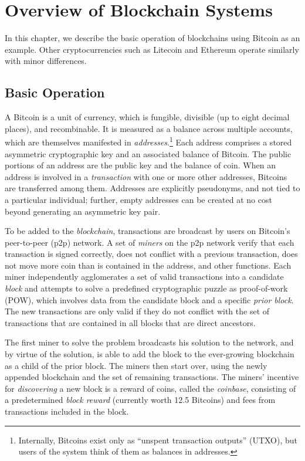 \chapter{Overview of Blockchain Systems}

In this chapter, we describe the basic operation of blockchains using Bitcoin as an example. Other cryptocurrencies such as Litecoin and Ethereum operate similarly with minor differences.

\section{Basic Operation}

 A Bitcoin is a unit of currency, which is
fungible, divisible (up to eight decimal places), and recombinable.
It is measured as a balance across multiple accounts, which are
themselves manifested in \emph{addresses}.$\!$\footnote{Internally,
  Bitcoins exist only as ``unspent transaction outputs'' (UTXO), but
  users of the system think of them as balances in addresses. } Each address
comprises a stored asymmetric cryptographic key and an associated
balance of Bitcoin. The public portions of an address are the public
key and the balance of coin. When an address is involved in a
\emph{transaction} with one or more other addresses, Bitcoins are
transferred among them. Addresses are explicitly pseudonyms, and not tied to a particular 
individual; further, empty addresses can be created at no cost beyond
 generating an asymmetric key pair.

 To be added to the {\em blockchain},
transactions are broadcast by users on Bitcoin's peer-to-peer (p2p) network. A set of
\emph{miners} on the p2p network verify that each transaction is
signed correctly, does not conflict with a previous transaction, does not
move more coin than is contained in the address, and other functions.
Each miner independently agglomerates a set of valid transactions into
a candidate \emph{block} and attempts to solve a predefined
cryptographic puzzle as proof-of-work (POW), which involves data
from the candidate block and a specific {\em prior block}. The
new transactions  are only valid if they do not
conflict with the set of transactions that are contained in all
blocks that are direct ancestors.

The first miner to solve the problem broadcasts his solution to the
network, and by virtue of the solution, is able to add the block to
the ever-growing blockchain as a child of the prior block. The miners
then start over, using the newly appended blockchain and the set of
remaining transactions. The miners' incentive for {\em discovering}
a new block is a reward of coins, called the {\em coinbase},
consisting of a predetermined {\em block reward} (currently worth 12.5 Bitcoins)
and fees from transactions included in the block.

